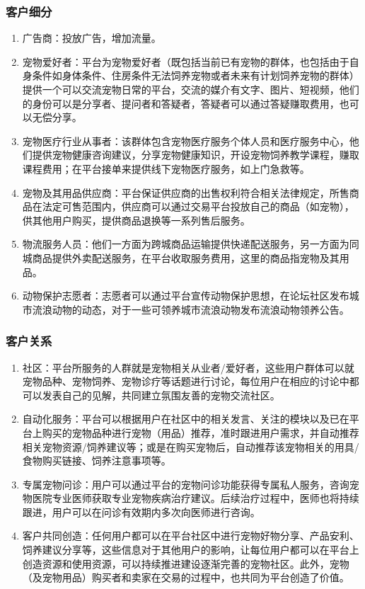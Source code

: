 \documentclass[a4paper]{ctexart}
\begin{document}
\subsubsection{客户细分}

\begin{enumerate}[label=\alph*.]
  \item 广告商：投放广告，增加流量。
  \item 宠物爱好者：平台为宠物爱好者（既包括当前已有宠物的群体，也包括由于自身条件如身体条件、住房条件无法饲养宠物或者未来有计划饲养宠物的群体）提供一个可以交流宠物日常的平台，交流的媒介有文字、图片、短视频，他们的身份可以是分享者、提问者和答疑者，答疑者可以通过答疑赚取费用，也可以无偿分享。
  \item 宠物医疗行业从事者：该群体包含宠物医疗服务个体人员和医疗服务中心，他们提供宠物健康咨询建议，分享宠物健康知识，开设宠物饲养教学课程，赚取课程费用；在平台接单来提供线下宠物医疗服务，如上门急救等。
  \item 宠物及其用品供应商：平台保证供应商的出售权利符合相关法律规定，所售商品在法定可售范围内，供应商可以通过交易平台投放自己的商品（如宠物），供其他用户购买，提供商品退换等一系列售后服务。
  \item 物流服务人员：他们一方面为跨城商品运输提供快递配送服务，另一方面为同城商品提供外卖配送服务，在平台收取服务费用，这里的商品指宠物及其用品。
  \item 动物保护志愿者：志愿者可以通过平台宣传动物保护思想，在论坛社区发布城市流浪动物的动态，对于一些可领养城市流浪动物发布流浪动物领养公告。
\end{enumerate}

\subsubsection{客户关系}

\begin{enumerate}[label=\alph*.]
  \item 社区：平台所服务的人群就是宠物相关从业者/爱好者，这些用户群体可以就宠物品种、宠物饲养、宠物诊疗等话题进行讨论，每位用户在相应的讨论中都可以发表自己的见解，共同建立氛围友善的宠物交流社区。
  \item 自动化服务：平台可以根据用户在社区中的相关发言、关注的模块以及已在平台上购买的宠物品种进行宠物（用品）推荐，准时跟进用户需求，并自动推荐相关宠物资源/饲养建议等；或是在购买宠物后，自动推荐该宠物相关的用具/食物购买链接、饲养注意事项等。
  \item 专属宠物问诊：用户可以通过平台的宠物问诊功能获得专属私人服务，咨询宠物医院专业医师获取专业宠物疾病治疗建议。后续治疗过程中，医师也将持续跟进，用户可以在问诊有效期内多次向医师进行咨询。
  \item 客户共同创造：任何用户都可以在平台社区中进行宠物好物分享、产品安利、饲养建议分享等，这些信息对于其他用户的影响，让每位用户都可以在平台上创造资源和使用资源，可以持续推进建设逐渐完善的宠物社区。此外，宠物（及宠物用品）购买者和卖家在交易的过程中，也共同为平台创造了价值。
\end{enumerate}
\end{document}
